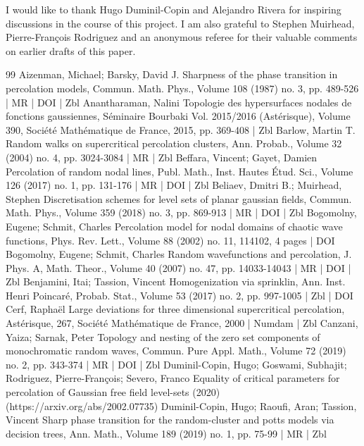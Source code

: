 \documentclass[10pt]{amsart}
\theoremstyle{definition}\newtheorem{defi}[theo]{Definition}\newtheorem{rema}[theo]{Remark}\newtheorem{exam}[theo]{Example}\newtheorem{exem}[theo]{Example}\newtheorem{nota}[theo]{Notation}
\begin{document}
I would like to thank Hugo Duminil-Copin and Alejandro Rivera for inspiring discussions in the course of this project. I am also grateful to Stephen Muirhead, Pierre-Fran\c{c}ois Rodriguez and an anonymous referee for their valuable comments on earlier drafts of this paper.



\begin{thebibliography}{99}
Aizenman, Michael; Barsky, David J. Sharpness of the phase transition in percolation models, Commun. Math. Phys., Volume 108 (1987) no. 3, pp. 489-526 | MR | DOI | Zbl
Anantharaman, Nalini Topologie des hypersurfaces nodales de fonctions gaussiennes, Séminaire Bourbaki Vol. 2015/2016 (Astérisque), Volume 390, Société Mathématique de France, 2015, pp. 369-408 | Zbl
Barlow, Martin T. Random walks on supercritical percolation clusters, Ann. Probab., Volume 32 (2004) no. 4, pp. 3024-3084 | MR | Zbl
Beffara, Vincent; Gayet, Damien Percolation of random nodal lines, Publ. Math., Inst. Hautes Étud. Sci., Volume 126 (2017) no. 1, pp. 131-176 | MR | DOI | Zbl
Beliaev, Dmitri B.; Muirhead, Stephen Discretisation schemes for level sets of planar gaussian fields, Commun. Math. Phys., Volume 359 (2018) no. 3, pp. 869-913 | MR | DOI | Zbl
Bogomolny, Eugene; Schmit, Charles Percolation model for nodal domains of chaotic wave functions, Phys. Rev. Lett., Volume 88 (2002) no. 11, 114102, 4 pages | DOI
Bogomolny, Eugene; Schmit, Charles Random wavefunctions and percolation, J. Phys. A, Math. Theor., Volume 40 (2007) no. 47, pp. 14033-14043 | MR | DOI | Zbl
Benjamini, Itai; Tassion, Vincent Homogenization via sprinklin, Ann. Inst. Henri Poincaré, Probab. Stat., Volume 53 (2017) no. 2, pp. 997-1005 | Zbl | DOI
Cerf, Raphaël Large deviations for three dimensional supercritical percolation, Astérisque, 267, Société Mathématique de France, 2000 | Numdam | Zbl
Canzani, Yaiza; Sarnak, Peter Topology and nesting of the zero set components of monochromatic random waves, Commun. Pure Appl. Math., Volume 72 (2019) no. 2, pp. 343-374 | MR | DOI | Zbl
Duminil-Copin, Hugo; Goswami, Subhajit; Rodriguez, Pierre-François; Severo, Franco Equality of critical parameters for percolation of Gaussian free field level-sets (2020) (https://arxiv.org/abs/2002.07735)
Duminil-Copin, Hugo; Raoufi, Aran; Tassion, Vincent Sharp phase transition for the random-cluster and potts models via decision trees, Ann. Math., Volume 189 (2019) no. 1, pp. 75-99 | MR | Zbl

\end{thebibliography}
\end{document}
